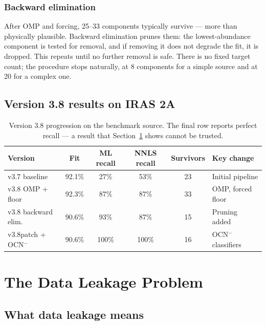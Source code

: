 \documentclass[11pt,a4paper]{article}
\newcommand{\ocn}{OCN$^-$}
\begin{document}
\subsubsection*{Backward elimination}

After OMP and forcing, 25--33 components typically survive --- more than
physically plausible. Backward elimination prunes them: the
lowest-abundance component is tested for removal, and if removing it does
not degrade the fit, it is dropped. This repeats until no further removal
is safe. There is no fixed target count; the procedure stops naturally,
at 8 components for a simple source and at 20 for a complex one.

\subsection{Version 3.8 results on IRAS 2A}

\begin{table}[H]
\centering
\small
\begin{tabular}{@{}lccccl@{}}
\toprule
\textbf{Version} & \textbf{Fit} & \textbf{ML recall} &
\textbf{NNLS recall} & \textbf{Survivors} & \textbf{Key change} \\
\midrule
v3.7 baseline        & 92.1\% & 27\%  & 53\%  & 23 & Initial pipeline \\
v3.8 OMP + floor     & 92.3\% & 87\%  & 87\%  & 33 & OMP, forced floor \\
v3.8 backward elim.  & 90.6\% & 93\%  & 87\%  & 15 & Pruning added \\
v3.8patch + \ocn     & 90.6\% & 100\% & 100\% & 16 & \ocn{} classifiers \\
\bottomrule
\end{tabular}
\caption{Version 3.8 progression on the benchmark source. The final row
reports perfect recall --- a result that Section~\ref{sec:leakage} shows
cannot be trusted.}
\end{table}

\section{The Data Leakage Problem}
\label{sec:leakage}

\subsection{What data leakage means}
\end{document}
